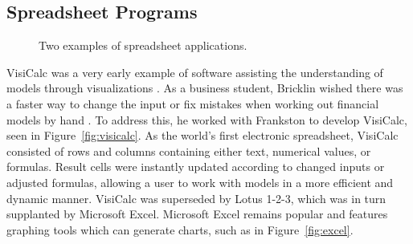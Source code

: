 \subsection{Spreadsheet Programs}

\begin{figure}
\centering


	\caption[Two examples of spreadsheet applications]{Two examples of spreadsheet applications.}
	\label{fig:spreadsheets}
\end{figure}

VisiCalc was a very early example of software assisting the understanding of models through visualizations \cite{grad2007}.  As a business student, Bricklin wished there was a faster way to change the input or fix mistakes when working out financial models by hand \citeyearpar{bricklin1999}.  To address this, he worked with Frankston to develop VisiCalc, seen in Figure~\ref{fig:visicalc}.  As the world's first electronic spreadsheet, VisiCalc consisted of rows and columns containing either text, numerical values, or formulas.  Result cells were instantly updated according to changed inputs or adjusted formulas, allowing a user to work with models in a more efficient and dynamic manner.  VisiCalc was superseded by Lotus 1-2-3, which was in turn supplanted by Microsoft Excel.  Microsoft Excel remains popular and features graphing tools which can generate charts, such as in Figure~\ref{fig:excel}.

